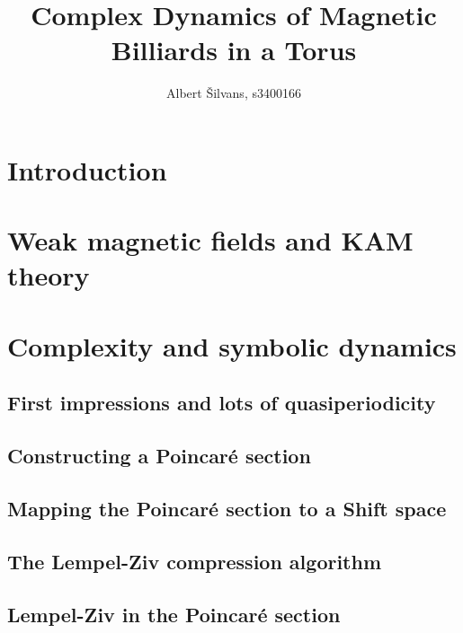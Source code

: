 \documentclass[notitlepage, a4paper]{article}
\title{Complex Dynamics of Magnetic Billiards in a Torus}
\author{Albert \v{S}ilvans, s3400166}
\theoremstyle{definition}
\begin{document}
\maketitle
\newpage
\tableofcontents
\listoffigures
\newpage

\section{Introduction}



\newpage

\section{Weak magnetic fields and KAM theory}





\newpage

\section{Complexity and symbolic dynamics}


\subsection{First impressions and lots of quasiperiodicity}


\subsection{Constructing a Poincar\'e section}


\subsection{Mapping the Poincar\'e section to a Shift space}


\subsection{The Lempel-Ziv compression algorithm}


\subsection{Lempel-Ziv in the Poincar\'e section}

\end{document}
